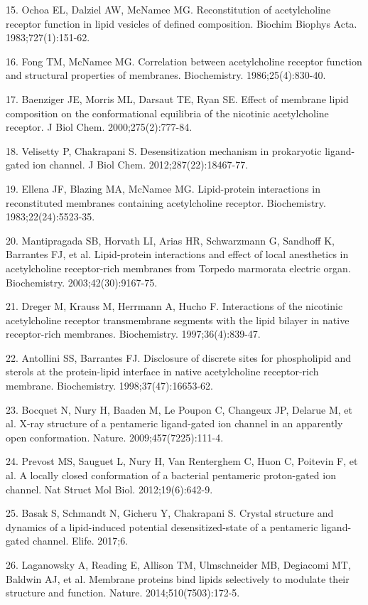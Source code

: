 15. Ochoa EL, Dalziel AW, McNamee MG. Reconstitution of acetylcholine
receptor function in lipid vesicles of defined composition. Biochim
Biophys Acta. 1983;727(1):151-62.

16. Fong TM, McNamee MG. Correlation between acetylcholine receptor
function and structural properties of membranes. Biochemistry.
1986;25(4):830-40.

17. Baenziger JE, Morris ML, Darsaut TE, Ryan SE. Effect of membrane
lipid composition on the conformational equilibria of the nicotinic
acetylcholine receptor. J Biol Chem. 2000;275(2):777-84.

18. Velisetty P, Chakrapani S. Desensitization mechanism in prokaryotic
ligand-gated ion channel. J Biol Chem. 2012;287(22):18467-77.

19. Ellena JF, Blazing MA, McNamee MG. Lipid-protein interactions in
reconstituted membranes containing acetylcholine receptor. Biochemistry.
1983;22(24):5523-35.

20. Mantipragada SB, Horvath LI, Arias HR, Schwarzmann G, Sandhoff K,
Barrantes FJ, et al. Lipid-protein interactions and effect of local
anesthetics in acetylcholine receptor-rich membranes from Torpedo
marmorata electric organ. Biochemistry. 2003;42(30):9167-75.

21. Dreger M, Krauss M, Herrmann A, Hucho F. Interactions of the
nicotinic acetylcholine receptor transmembrane segments with the lipid
bilayer in native receptor-rich membranes. Biochemistry.
1997;36(4):839-47.

22. Antollini SS, Barrantes FJ. Disclosure of discrete sites for
phospholipid and sterols at the protein-lipid interface in native
acetylcholine receptor-rich membrane. Biochemistry.
1998;37(47):16653-62.

23. Bocquet N, Nury H, Baaden M, Le Poupon C, Changeux JP, Delarue M, et
al. X-ray structure of a pentameric ligand-gated ion channel in an
apparently open conformation. Nature. 2009;457(7225):111-4.

24. Prevost MS, Sauguet L, Nury H, Van Renterghem C, Huon C, Poitevin F,
et al. A locally closed conformation of a bacterial pentameric
proton-gated ion channel. Nat Struct Mol Biol. 2012;19(6):642-9.

25. Basak S, Schmandt N, Gicheru Y, Chakrapani S. Crystal structure and
dynamics of a lipid-induced potential desensitized-state of a pentameric
ligand-gated channel. Elife. 2017;6.

26. Laganowsky A, Reading E, Allison TM, Ulmschneider MB, Degiacomi MT,
Baldwin AJ, et al. Membrane proteins bind lipids selectively to modulate
their structure and function. Nature. 2014;510(7503):172-5.

